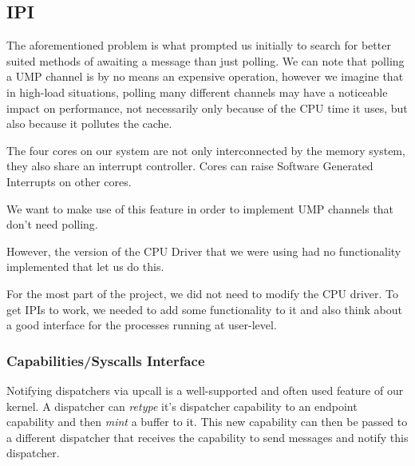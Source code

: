 \label{sec:ipi}
\subsection{IPI}
The aforementioned problem is what prompted us initially to search for better suited methods of awaiting
a message than just polling. We can note that polling a UMP channel is by no means an expensive
operation, however we imagine that in high-load situations, polling many different channels
may have a noticeable impact on performance, not necessarily only because of the CPU time it
uses, but also because it pollutes the cache.

The four cores on our system are not only interconnected by the memory system, they also share
an interrupt controller. Cores can raise Software Generated Interrupts on other cores.

We want to make use of this feature in order to implement UMP channels that don't need polling.

However, the version of the CPU Driver that we were using had no functionality implemented that
let us do this.


For the most part of the project, we did not need to modify the CPU driver. To get IPIs to work,
we needed to add some functionality to it and also think about a good interface for the
processes running at user-level.

\subsubsection{Capabilities/Syscalls Interface}
Notifying dispatchers via upcall is a well-supported and often used feature of our kernel.
A dispatcher can \emph{retype} it's dispatcher capability to an endpoint capability and then
\emph{mint} a buffer to it. This new capability can then be passed to a different dispatcher
that receives the capability to send messages and notify this dispatcher.

